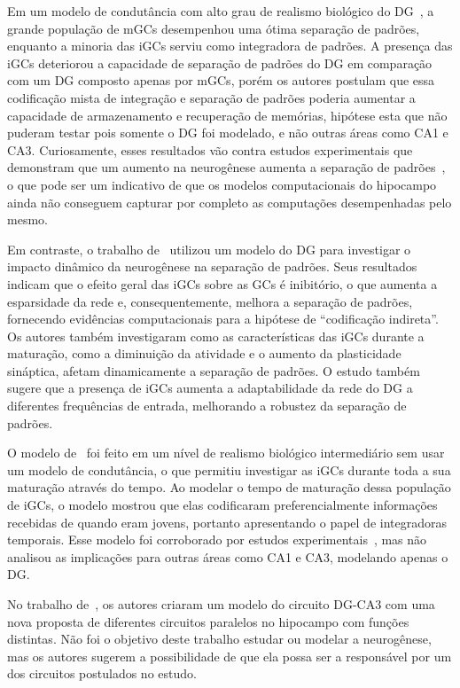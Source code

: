 Em um modelo de condutância com alto grau de realismo biológico do DG~\cite{kimEffect2024}, a grande população de mGCs desempenhou
uma ótima separação de padrões, enquanto a minoria das iGCs serviu como integradora de padrões. A presença das iGCs deteriorou a
capacidade de separação de padrões do DG em comparação com um DG composto apenas por mGCs, porém os autores postulam que essa
codificação mista de integração e separação de padrões poderia aumentar a capacidade de armazenamento e recuperação de memórias,
hipótese esta que não puderam testar pois somente o DG foi modelado, e não outras áreas como CA1 e CA3. Curiosamente, esses
resultados vão contra estudos experimentais que demonstram que um aumento na neurogênese aumenta a separação de
padrões~\cite{sahayIncreasing2011}, o que pode ser um indicativo de que os modelos computacionais do hipocampo ainda não conseguem
capturar por completo as computações desempenhadas pelo mesmo.

Em contraste, o trabalho de~ utilizou um modelo do DG para investigar o impacto dinâmico da
neurogênese na separação de padrões. Seus resultados indicam que o efeito geral das iGCs sobre as GCs é inibitório, o que aumenta
a esparsidade da rede e, consequentemente, melhora a separação de padrões, fornecendo evidências computacionais para a hipótese de
``codificação indireta''. Os autores também investigaram como as características das iGCs durante a maturação, como a diminuição
da atividade e o aumento da plasticidade sináptica, afetam dinamicamente a separação de padrões. O estudo também sugere que a
presença de iGCs aumenta a adaptabilidade da rede do DG a diferentes frequências de entrada, melhorando a robustez da separação de
padrões.

O modelo de~ foi feito em um nível de realismo biológico intermediário sem usar um modelo de
condutância, o que permitiu investigar as iGCs durante toda a sua maturação através do tempo. Ao modelar o tempo de maturação
dessa população de iGCs, o modelo mostrou que elas codificaram preferencialmente informações recebidas de quando eram jovens,
portanto apresentando o papel de integradoras temporais. Esse modelo foi corroborado por estudos
experimentais~\cite{berdugo-vegaSharpening2023}, mas não analisou as implicações para outras áreas como CA1 e CA3, modelando
apenas o DG.

No trabalho de~, os autores criaram um modelo do circuito DG-CA3 com uma nova proposta de
diferentes circuitos paralelos no hipocampo com funções distintas. Não foi o objetivo deste trabalho estudar ou modelar a
neurogênese, mas os autores sugerem a possibilidade de que ela possa ser a responsável por um dos circuitos postulados no estudo.

